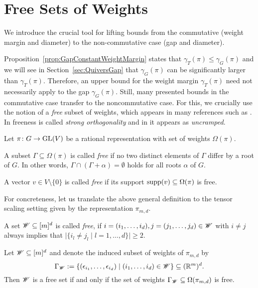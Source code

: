 \section{Free Sets of Weights} \label{sec:Free}
We introduce the crucial tool for lifting bounds from the commutative (weight margin and diameter) to the non-commutative case (gap and diameter).

Proposition~\ref{prop:GapConstantWeightMargin} states that $\gamma_T(\pi) \leq \gamma_G(\pi)$ and we will see in Section~\ref{sec:QuiversGap} that $\gamma_G(\pi)$ can be significantly larger than $\gamma_{T}(\pi)$. Therefore, an upper bound for the weight margin $\gamma_{T}(\pi)$ need not necessarily apply to the gap $\gamma_{G}(\pi)$. Still, many presented bounds in the commutative case transfer to the noncommutative case.
For this, we crucially use the notion of a \emph{free} subset of weights, which appears in many references such as \cite{Sjamaar, franz, CVZ}.
In \cite{dadok1985polar} freeness is called \emph{strong orthogonality} and in \cite{derksen2020exponential} it appears as \emph{uncramped}.

\begin{defn}  \label{defn:freeGeneral}
	Let $\pi \colon G \to \operatorname{GL}(V)$ be a rational representation with set of weights $\Omega(\pi)$.
	
	A subset $\Gamma \subseteq \Omega(\pi)$ is called \emph{free} if no two distinct elements of $\Gamma$ differ by a root of $G$. In other words, $\Gamma \cap (\Gamma + \alpha) = \emptyset$ holds for all roots $\alpha$ of $G$.
	
	A vector $v \in V\setminus \{0\}$ is called \emph{free} if its support $\operatorname{supp}(v) \subseteq \Omega(\pi)$ is free.
	\hfill{}
\end{defn}

For concreteness, let us translate the above general definition to the tensor scaling setting given by the representation $\pi_{m,d}$.

\begin{defn}\label{defn:freeTensors} %
	A set $\mathscr{W} \subseteq [m]^d$ is called \emph{free}, if $i = (i_1, \ldots, i_d), j = (j_1, \ldots, j_d) \in \mathscr{W}$ with $i \neq j$ always implies that $\vert \lbrace i_l \neq j_l \mid l=1, \ldots, d \rbrace \vert \geq 2$.
	\hfill{}
\end{defn}

\begin{prop} \label{prop:FreeTensorVsFreeGeneral}
	Let $\mathscr{W} \subseteq [m]^d$ and denote the induced subset of weights of $\pi_{m,d}$ by 
	\[\Gamma_{\mathscr{W}} := \lbrace (\epsilon_{i_1}, \ldots, \epsilon_{i_d}) \mid (i_1,\ldots,i_d) \in \mathscr{W} \rbrace \subseteq (\mathbb R^m)^d .\]
	Then $\mathscr{W}$ is a free set if and only if the set of weights $\Gamma_{\mathscr{W}} \subseteq \Omega(\pi_{m,d})$ is free.
\end{prop}

